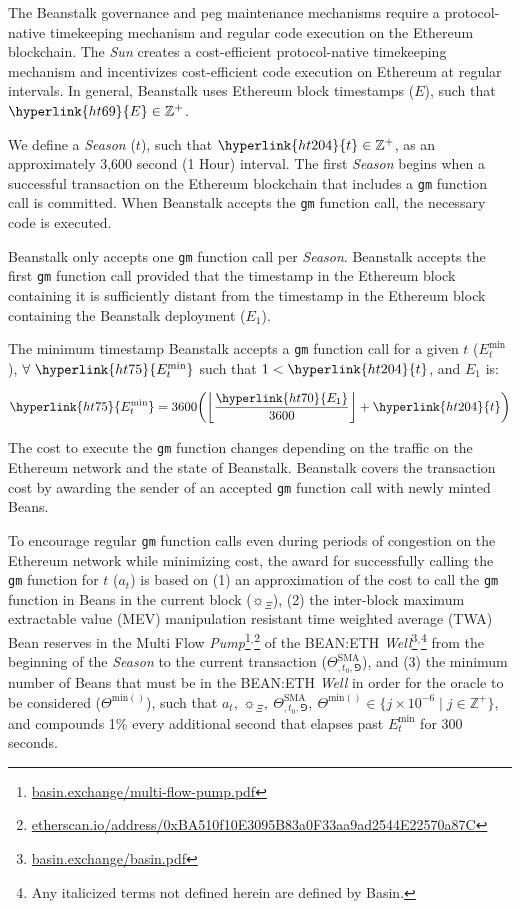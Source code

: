 \documentclass[tikz]{article}
\newcommand{\code}[1]{\texttt{#1}}
\newcommand{\term}[1]{\textsl{#1}}
\newcommand{\fref}[1]{\footnote{\href{http://#1}{#1}}}
\newcommand{\bean}{} %
\begin{document}
The Beanstalk governance and peg maintenance mechanisms require a protocol-native timekeeping mechanism and regular code execution on the Ethereum blockchain. The \term{Sun} creates a cost-efficient protocol-native timekeeping mechanism and incentivizes cost-efficient code execution on Ethereum at regular intervals. In general, Beanstalk uses Ethereum block timestamps (\hyperlink{ht69}{$E$}), such that $\hyperlink{ht69}{E} \in \mathbb{Z}^{+}$.

We define a \term{Season} (\hyperlink{ht204}{$t$}), such that $\hyperlink{ht204}{t} \in \mathbb{Z}^{+}$, as an approximately 3,600 second (1 Hour) interval. The first \term{Season} begins when a successful transaction on the Ethereum blockchain that includes a \code{gm} function call is committed. When Beanstalk accepts the \code{gm} function call, the necessary code is executed.

Beanstalk only accepts one \code{gm} function call per \term{Season}. Beanstalk accepts the first \code{gm} function call provided that the timestamp in the Ethereum block containing it is sufficiently distant from the timestamp in the Ethereum block containing the Beanstalk deployment (\hyperlink{ht70}{$E_1$}).

The minimum timestamp Beanstalk accepts a \code{gm} function call for a given \hyperlink{ht204}{$t$} (\hyperlink{ht75}{$E_{t}^{\text{min}}$}), $\forall\ \hyperlink{ht75}{E_{t}^{\text{min}}}$ such that $1 < \hyperlink{ht204}{t}$, and \hyperlink{ht70}{$E_1$} is:

    $$
        \hyperlink{ht75}{E_{t}^{\text{min}}} = 
            3600{\left
                ({\left\lfloor\frac{\hyperlink{ht70}{E_1}}{3600}\right\rfloor} + \hyperlink{ht204}{t}\right)}
    $$

The cost to execute the \code{gm} function changes depending on the traffic on the Ethereum network and the state of Beanstalk. Beanstalk covers the transaction cost by awarding the sender of an accepted \code{gm} function call with newly minted Beans. 

To encourage regular \code{gm} function calls even during periods of congestion on the Ethereum network while minimizing cost, the award for successfully calling the \code{gm} function for $t$ ($a_t$) is based on (1) an approximation of the cost to call the \code{gm} function in Beans in the current block ($\sun_{\Xi}$), (2) the inter-block maximum extractable value (MEV) manipulation resistant time weighted average (TWA) Bean reserves in the Multi Flow \term{Pump}\fref{basin.exchange/multi-flow-pump.pdf}$^{,}$\fref{etherscan.io/address/0xBA510f10E3095B83a0F33aa9ad2544E22570a87C} of the BEAN:ETH \term{Well}\fref{basin.exchange/basin.pdf}$^{,}$\footnote{Any italicized terms not defined herein are defined by Basin.} from the beginning of the \term{Season} to the current transaction ($\Theta^{\text{SMA}}_{\bean,t_0,\Game}$), and (3) the minimum number of Beans that must be in the BEAN:ETH \term{Well} in order for the oracle to be considered ($\Theta^{\text{min}(\bean)}$), such that $a_t,\ \sun_{\Xi},\ \Theta^{\text{SMA}}_{\bean,t_0,\Game},\ \Theta^{\text{min}(\bean)} \in \{j \times 10^{-6} \mid j \in \mathbb{Z}^{+} \}$, and compounds 1\% every additional second that elapses past $E_t^{\text{min}}$ for 300 seconds. 
\end{document}
